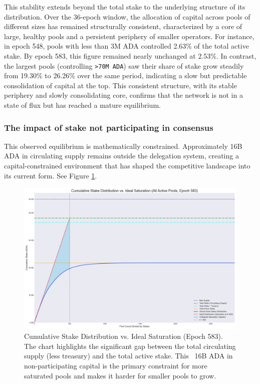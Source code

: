 \documentclass[11pt, letterpaper]{article}
\begin{document}
This stability extends beyond the total stake to the underlying structure of
its distribution. Over the 36-epoch window, the allocation of capital across
pools of different sizes has remained structurally consistent, characterized by
a core of large, healthy pools and a persistent periphery of smaller operators.
For instance, in epoch 548, pools with less than 3M ADA controlled 2.63\% of
the total active stake. By epoch 583, this figure remained nearly unchanged at
2.53\%. In contrast, the largest pools (controlling \texttt{>70M ADA}) saw
their share of stake grow steadily from 19.30\% to 26.26\% over the same
period, indicating a slow but predictable consolidation of capital at the top.
This consistent structure, with its stable periphery and slowly consolidating
core, confirms that the network is not in a state of flux but has reached a
mature equilibrium.

\subsubsection{The impact of stake not participating in consensus}

This observed equilibrium is mathematically constrained. Approximately 16B ADA in circulating supply remains
outside the delegation system, creating a capital-constrained environment that
has shaped the competitive landscape into its current form. See Figure
\ref{fig:cumulative-stake}.

\begin{figure}[H]
	\centering
	\includegraphics[width=\textwidth]{img/cumulative_stake_distribution_epoch_583_annotated.png}
	\caption{Cumulative Stake Distribution vs. Ideal Saturation (Epoch 583). The chart highlights the
		significant gap between the total circulating supply (less treasury) and the total active stake. This ~16B ADA
		in non-participating capital is the primary constraint for more saturated pools and makes it harder for smaller pools to grow.}
	\label{fig:cumulative-stake}
\end{figure}
\end{document}

